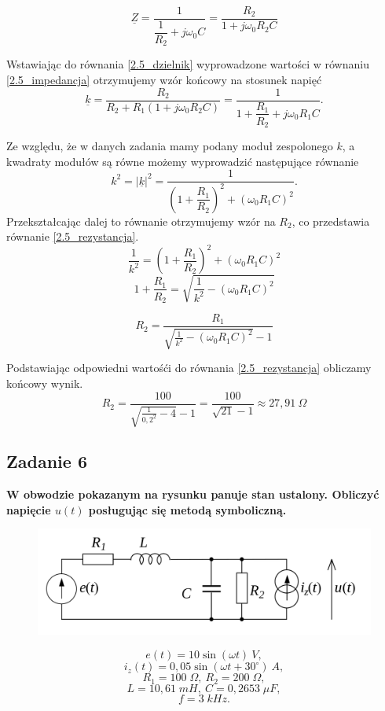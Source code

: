 \documentclass[12pt, a4paper]{article}
\begin{document}
\begin{equation}\label{2.5_impedancja}
  \underline{Z} = \frac{1}{\dfrac{1}{R_2}+j\omega_0C} =
  \frac{R_2}{1+j\omega_0R_2C}
\end{equation}

Wstawiając do równania \ref{2.5_dzielnik} wyprowadzone wartości w równaniu
\ref{2.5_impedancja} otrzymujemy wzór końcowy na stosunek napięć
$$
  \underline{k} = \frac{R_2}{R_2+R_1(1+j\omega_0R_2C)} =
  \frac{1}{1+\dfrac{R_1}{R_2}+j\omega_0R_1C}.
$$

Ze względu, że w danych zadania mamy podany moduł zespolonego $k$, a kwadraty
modułów są równe możemy wyprowadzić następujące równanie
$$
  k^2=|\underline{k}|^2=\frac{1}{\left(1+\dfrac{R_1}{R_2}\right)^2+
    \left(\omega_0R_1C\right)^2}.
$$
Przekształcając dalej to równanie otrzymujemy wzór na $R_2$, co przedstawia
równanie \ref{2.5_rezystancja}.
$$
  \frac{1}{k^2} = \left(1+\dfrac{R_1}{R_2}\right)^2+\left(\omega_0R_1C\right)^2
$$
$$
  1+\frac{R_1}{R_2} = \sqrt{\frac{1}{k^2}-\left(\omega_0R_1C\right)^2}
$$

\begin{equation}\label{2.5_rezystancja}
  R_2 = \frac{R_1}{\sqrt{\frac{1}{k^2}-\left(\omega_0R_1C\right)^2}-1}
\end{equation}

Podstawiając odpowiedni wartośći do równania \ref{2.5_rezystancja} obliczamy
końcowy wynik.
$$
  R_2 = \frac{100}{\sqrt{\frac{1}{0,2^2}-4}-1} = \frac{100}{\sqrt{21}-1}
  \approx 27,91\: \Omega
$$

\subsection{Zadanie 6}
\textbf{W obwodzie pokazanym na rysunku panuje stan ustalony. Obliczyć napięcie
  $u(t)$ posługując się metodą symboliczną.}\\
\begin{minipage}{0.6\textwidth}
  \begin{figure}[H]
    \centering
    \includegraphics[width = \textwidth]{./images/Lista_2/Zadanie_6.png}
  \end{figure}
\end{minipage}
\hspace*{0.4cm}
\begin{minipage}{0.35\textwidth}
  $$
    e(t) = 10\sin\left(\omega t\right)\: V,
  $$
  $$
    i_z(t) = 0,05\sin\left(\omega t+30^\circ\right)\: A,
  $$
  $$
    R_1 = 100\; \Omega, \: R_2 = 200\; \Omega,
  $$
  $$
    L = 10,61\; mH,\: C = 0,2653\; \mu F,
  $$
  $$
    f = 3\;  kHz.
  $$
\end{minipage}\\[0.3cm]
\vspace*{0.3cm}
\end{document}
